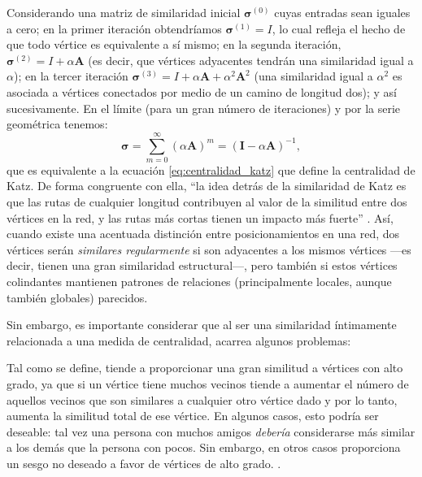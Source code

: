 \documentclass[letterpaper, 11pt]{book}
\theoremstyle{definition}
\theoremstyle{remark}
\begin{document}
Considerando una matriz de similaridad inicial $\mathbf{\sigma}^{(0)}$ cuyas entradas sean iguales a cero; 
en la primer iteración obtendríamos $\mathbf{\sigma}^{(1)}= I$, lo cual refleja el hecho de que todo vértice es equivalente a sí mismo; 
en la segunda iteración, $\mathbf{\sigma}^{(2)}= I + \alpha \mathbf{A}$ (es decir, que vértices adyacentes tendrán una similaridad igual a $\alpha$); 
en la tercer iteración $\mathbf{\sigma}^{(3)}= I + \alpha \mathbf{A} + \alpha^{2} \mathbf{A}^{2}$ (una similaridad igual a $\alpha^{2}$ es asociada a vértices conectados por medio de un camino de longitud dos); y así sucesivamente. 
En el límite (para un gran número de iteraciones) y por la serie geométrica tenemos:
\begin{equation}\label{eq:similaridadKatz}
    \mathbf{\sigma} = 
    \sum_{m=0}^{\infty}(\alpha \mathbf{A})^{m} = 
    (\mathbf{I}-\alpha\mathbf{A})^{-1},
\end{equation} 
que es equivalente a la ecuación \ref{eq:centralidad_katz} que define la centralidad de Katz. 
De forma congruente con ella, ``la idea detrás de la similaridad de Katz es que las rutas de cualquier longitud contribuyen al valor de la similitud entre dos vértices en la red, y las rutas más cortas tienen un impacto más fuerte'' \citep[447]{2018_Duricic_RegularEquivalence}. 
Así, cuando existe una acentuada distinción entre posicionamientos en una red, dos vértices serán \emph{similares regularmente} si son adyacentes a los mismos vértices ---es decir, tienen una gran similaridad estructural---, pero también si estos vértices colindantes mantienen patrones de relaciones (principalmente locales, aunque también globales) parecidos. 


Sin embargo, es importante considerar que al ser una similaridad íntimamente relacionada a una medida de centralidad, acarrea algunos problemas: 

\begin{center}
    \begin{minipage}{0.9\linewidth}
        {\setlength{\parindent}{12pt}\small
         Tal como se define, tiende a proporcionar una gran similitud a vértices con alto grado, ya que si un vértice tiene muchos vecinos tiende a aumentar el número de aquellos vecinos que son similares a cualquier otro vértice dado y por lo tanto, aumenta la similitud total de ese vértice. 
         En algunos casos, esto podría ser deseable: tal vez una persona con muchos amigos \emph{debería} considerarse más similar a los demás que la persona con pocos. 
         Sin embargo, en otros casos proporciona un sesgo no deseado a favor de vértices de alto grado. 
         \normalsize \citep[224]{2010_Newman_Networks}.
        }
    \end{minipage}
\end{center}
\end{document}
